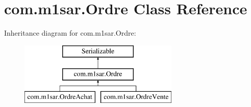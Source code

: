 \hypertarget{classcom_1_1m1sar_1_1_ordre}{}\section{com.\+m1sar.\+Ordre Class Reference}
\label{classcom_1_1m1sar_1_1_ordre}
Inheritance diagram for com.\+m1sar.\+Ordre\+:\begin{figure}[H]
\begin{center}
\leavevmode
\includegraphics[height=3.000000cm]{classcom_1_1m1sar_1_1_ordre}
\end{center}
\end{figure}

